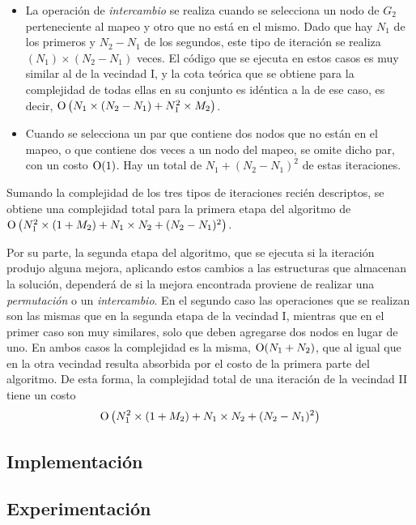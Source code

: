 \begin{itemize}
    \item La operación de \emph{intercambio} se realiza cuando se selecciona
    un nodo de $G_2$ perteneciente al mapeo y otro que no está en el mismo.
    Dado que hay $N_1$ de los primeros y $N_2 - N_1$ de los
    segundos, este tipo de iteración se realiza $(N_1) \times (N_2 - N_1)$
    veces. El código que se ejecuta en estos casos es muy similar al de la
    vecindad I, y la cota teórica que se obtiene para la complejidad de todas
    ellas en su conjunto es idéntica a la de ese caso, es decir,
    $\operatorname{O} \left( N_1 \times (N_2 - N_1) + N_1^2 \times M_2 \right)$.

    \item Cuando se selecciona un par que contiene dos nodos que no están en
    el mapeo, o que contiene dos veces a un nodo del mapeo, se omite dicho
    par, con un costo $\operatorname{O}(1)$. Hay un total de $N_1 + (N_2 - N_1)^2$ de
    estas iteraciones.
\end{itemize}

Sumando la complejidad de los tres tipos de iteraciones recién descriptos, se
obtiene una complejidad total para la primera etapa del algoritmo de
$\operatorname{O} \left( N_1^2 \times (1 + M_2) + N_1 \times N_2 + (N_2 - N_1)^2 \right)$.

Por su parte, la segunda etapa del algoritmo, que se ejecuta si la
iteración produjo alguna mejora, aplicando estos cambios a las estructuras
que almacenan la solución, dependerá de si la mejora encontrada proviene de
realizar una \emph{permutación} o un \emph{intercambio}. En el segundo
caso las operaciones que se realizan son las mismas que en la segunda etapa
de la vecindad I, mientras que en el primer caso son muy similares, solo que
deben agregarse dos nodos en lugar de uno. En ambos casos la complejidad es la
misma, $\operatorname{O} (N_1 + N_2)$, que al igual que en la otra vecindad resulta
absorbida por el costo de la primera parte del algoritmo. De esta forma, la
complejidad total de una iteración de la vecindad II tiene un costo
\[
\operatorname{O} \left( N_1^2 \times (1 + M_2) + N_1 \times N_2 + (N_2 - N_1)^2 \right)
\]


\subsection{Implementación}

\subsection{Experimentación}
